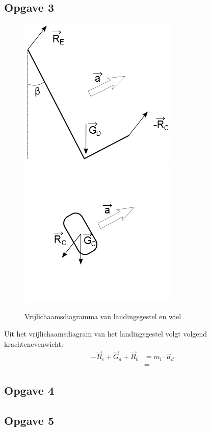 \subsection{Opgave 3}
\begin{figure}[H]
\center
  \includegraphics[width=0.45\linewidth]{./images/Vrijlichaamdiagram-1.png}
	\includegraphics[width=0.45\linewidth]{./images/Vrijlichaamdiagram-2.png}
  \caption{Vrijlichaamsdiagramma van landingsgestel en wiel}
  \label{image:diagramma}
\end{figure}
Uit het vrijlichaamsdiagram van het landingsgestel volgt volgend krachtenevenwicht:
\begin{equation}
\begin{split}
-\vec{R}_{c}+\vec{G}_{d}+\vec{R}_{b} &= m_{l} \cdot \vec{a}_{d}\\
&=
\end{split}
\label{eq:dyn2.5}
\end{equation}
\subsection{Opgave 4}
\subsection{Opgave 5}